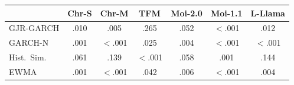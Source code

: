 \begin{tabular}{@{}lcccccc@{}}
\hline\hline
& Chr-S & Chr-M & TFM & Moi-2.0 & Moi-1.1 & L-Llama \\
\hline
GJR-GARCH        & .010 & .005 & .265 & .052 & $<$.001 & .012 \\
GARCH-N          & .001 & $<$.001 & .025 & .004 & $<$.001 & $<$.001 \\
Hist.\ Sim.      & .061 & .139 & $<$.001 & .058 & .001 & .144 \\
EWMA             & .001 & $<$.001 & .042 & .006 & $<$.001 & .004 \\
\hline\hline
\end{tabular}
